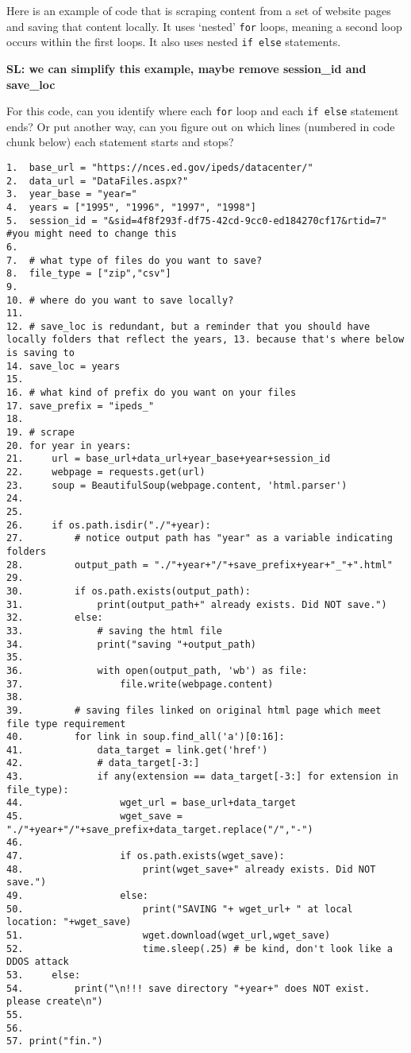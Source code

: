 \documentclass[
]{book}
\begin{document}
Here is an example of code that is scraping content from a set of website pages and saving that content locally. It uses `nested' \texttt{for} loops, meaning a second loop occurs within the first loops. It also uses nested \texttt{if\ else} statements.

\textbf{SL: we can simplify this example, maybe remove session\_id and save\_loc}

For this code, can you identify where each \texttt{for} loop and each \texttt{if\ else} statement ends? Or put another way, can you figure out on which lines (numbered in code chunk below) each statement starts and stops?

\begin{verbatim}
1.  base_url = "https://nces.ed.gov/ipeds/datacenter/"
2.  data_url = "DataFiles.aspx?"
3.  year_base = "year="
4.  years = ["1995", "1996", "1997", "1998"]
5.  session_id = "&sid=4f8f293f-df75-42cd-9cc0-ed184270cf17&rtid=7"  #you might need to change this
6. 
7.  # what type of files do you want to save?
8.  file_type = ["zip","csv"]
9. 
10. # where do you want to save locally?
11. 
12. # save_loc is redundant, but a reminder that you should have locally folders that reflect the years, 13. because that's where below is saving to
14. save_loc = years 
15. 
16. # what kind of prefix do you want on your files
17. save_prefix = "ipeds_" 
18. 
19. # scrape
20. for year in years:
21.     url = base_url+data_url+year_base+year+session_id 
22.     webpage = requests.get(url)
23.     soup = BeautifulSoup(webpage.content, 'html.parser')
24. 
25. 
26.     if os.path.isdir("./"+year):
27.         # notice output path has "year" as a variable indicating folders
28.         output_path = "./"+year+"/"+save_prefix+year+"_"+".html"
29.     
30.         if os.path.exists(output_path):
31.             print(output_path+" already exists. Did NOT save.")
32.         else:
33.             # saving the html file
34.             print("saving "+output_path)
35.     
36.             with open(output_path, 'wb') as file:
37.                 file.write(webpage.content) 
38.             
39.         # saving files linked on original html page which meet file type requirement
40.         for link in soup.find_all('a')[0:16]:  
41.             data_target = link.get('href')
42.             # data_target[-3:]
43.             if any(extension == data_target[-3:] for extension in file_type):
44.                 wget_url = base_url+data_target
45.                 wget_save = "./"+year+"/"+save_prefix+data_target.replace("/","-")
46.     
47.                 if os.path.exists(wget_save):
48.                     print(wget_save+" already exists. Did NOT save.")
49.                 else:
50.                     print("SAVING "+ wget_url+ " at local location: "+wget_save)
51.                     wget.download(wget_url,wget_save)
52.                     time.sleep(.25) # be kind, don't look like a DDOS attack
53.     else:
54.         print("\n!!! save directory "+year+" does NOT exist. please create\n")
55.     
56.     
57. print("fin.")
\end{verbatim}
\end{document}
